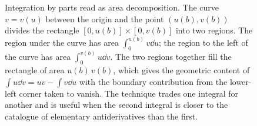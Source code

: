 \begin{figure}[htbp]
\centering
{}
\caption[Integration by parts as area decomposition]{Integration by
parts read as area decomposition. The curve $v = v(u)$ between the
origin and the point $(u(b), v(b))$ divides the rectangle
$[0, u(b)] \times [0, v(b)]$ into two regions. The region under
the curve has area $\int_{0}^{u(b)} v \dd u$; the region to the
left of the curve has area $\int_{0}^{v(b)} u \dd v$. The two
regions together fill the rectangle of area $u(b)\,v(b)$, which
gives the geometric content of $\int u \dd v = u v - \int v \dd u$
with the boundary contribution from the lower-left corner taken to
vanish. The technique trades one integral for another and is
useful when the second integral is closer to the catalogue of
elementary antiderivatives than the first.}
\label{fig:vol02:ch06:by-parts-geometry}
\end{figure}
